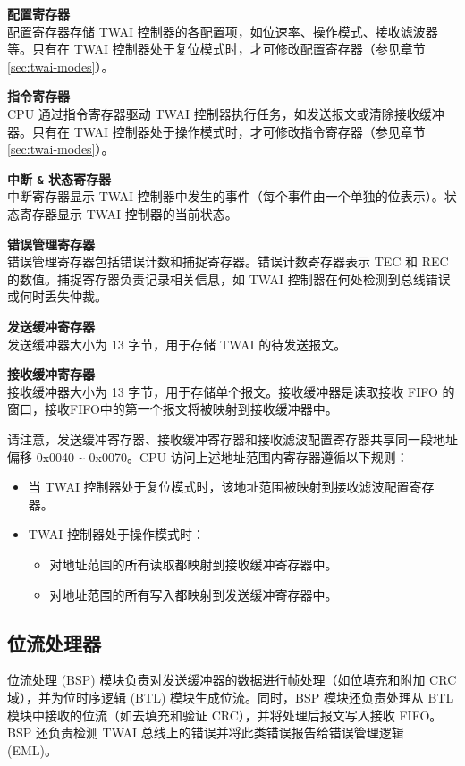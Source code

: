 \documentclass[main\_\_CN.tex]{subfiles}
\begin{document}
{\bfseries 配置寄存器}\\
配置寄存器存储 TWAI 控制器的各配置项，如位速率、操作模式、接收滤波器等。只有在 TWAI 控制器处于复位模式时，才可修改配置寄存器（参见章节 \ref{sec:twai-modes}）。

{\bfseries 指令寄存器}\\
CPU 通过指令寄存器驱动 TWAI 控制器执行任务，如发送报文或清除接收缓冲器。只有在 TWAI 控制器处于操作模式时，才可修改指令寄存器（参见章节 \ref{sec:twai-modes}）。

{\bfseries 中断 \verb+&+ 状态寄存器}\\
中断寄存器显示 TWAI 控制器中发生的事件（每个事件由一个单独的位表示）。状态寄存器显示 TWAI 控制器的当前状态。

{\bfseries 错误管理寄存器}\\
错误管理寄存器包括错误计数和捕捉寄存器。错误计数寄存器表示 TEC 和 REC 的数值。捕捉寄存器负责记录相关信息，如 TWAI 控制器在何处检测到总线错误或何时丢失仲裁。

{\bfseries 发送缓冲寄存器}\\
发送缓冲器大小为 13 字节，用于存储 TWAI 的待发送报文。

{\bfseries 接收缓冲寄存器}\\
接收缓冲器大小为 13 字节，用于存储单个报文。接收缓冲器是读取接收 FIFO 的窗口，接收FIFO中的第一个报文将被映射到接收缓冲器中。

请注意，发送缓冲寄存器、接收缓冲寄存器和接收滤波配置寄存器共享同一段地址偏移 0x0040 \verb+~+ 0x0070。CPU 访问上述地址范围内寄存器遵循以下规则：

\begin{itemize}
    \item 当 TWAI 控制器处于复位模式时，该地址范围被映射到接收滤波配置寄存器。
    \item TWAI 控制器处于操作模式时：
    \begin{itemize}
        \item 对地址范围的所有读取都映射到接收缓冲寄存器中。
        \item 对地址范围的所有写入都映射到发送缓冲寄存器中。
    \end{itemize}
\end{itemize}

\subsection{位流处理器}
位流处理 (BSP) 模块负责对发送缓冲器的数据进行帧处理（如位填充和附加 CRC 域），并为位时序逻辑 (BTL) 模块生成位流。同时，BSP 模块还负责处理从 BTL 模块中接收的位流（如去填充和验证 CRC），并将处理后报文写入接收 FIFO。BSP 还负责检测 TWAI 总线上的错误并将此类错误报告给错误管理逻辑 (EML)。
\end{document}
